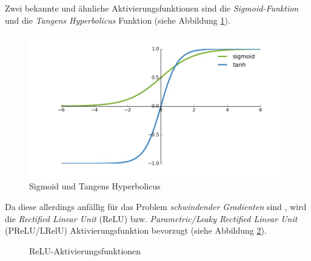 Zwei bekannte und ähnliche Aktivierungsfunktionen sind die \textit{Sigmoid-Funktion} und die \textit{Tangens Hyperbolicus} Funktion (siehe Abbildung \ref{sigmoid}).

\begin{figure}[ht]
	\begin{center}
		\includegraphics[width=15cm]{Bilder/sigmoid.jpg} 
		\caption[Sigmoid und Tangens Hyperbolicus]{Sigmoid und Tangens Hyperbolicus \cite{RonnyRestrepo.20170816}}
		\label{sigmoid}
	\end{center}
\end{figure}

Da diese allerdings anfällig für das Problem \textit{schwindender Gradienten} sind \cite[S. 276]{AurelienGeron.2018}, wird die \textit{Rectified Linear Unit} (ReLU) bzw. \textit{Parametric/Leaky Rectified Linear Unit} (PReLU/LRelU) Aktivierungsfunktion bevorzugt (siehe Abbildung \ref{relu}). 

\begin{figure}[ht]
	\caption[ReLU-Aktivierungsfunktionen]{ReLU-Aktivierungsfunktionen \cite{DanqingLiu.20171130}} 
	\label{relu}
\end{figure} 

